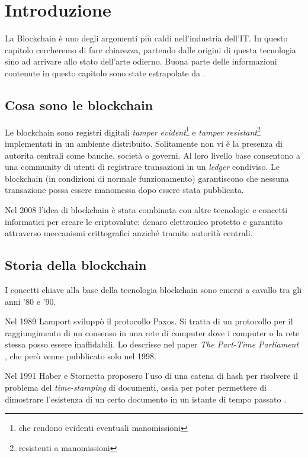 \chapter{Introduzione}

La Blockchain è uno degli argomenti più caldi nell'industria dell'IT. In questo
capitolo cercheremo di fare chiarezza, partendo dalle origini di questa tecnologia
sino ad arrivare allo stato dell'arte odierno.
Buona parte delle informazioni contenute in
questo capitolo sono state estrapolate da \cite{yaga2018blockchain}.

\section{Cosa sono le blockchain}
Le blockchain sono registri digitali
\textit{tamper evident}\footnote{che rendono evidenti eventuali manomissioni}
e \textit{tamper resistant}\footnote{resistenti a manomissioni}
implementati in un ambiente distribuito.
Solitamente non vi è la presenza di autorita centrali come banche, società o governi.
Al loro livello base consentono a una community di utenti di registrare
transazioni in un \textit{ledger} condiviso.
Le blockchain (in condizioni di normale funzionamento) garantiscono che
nessuna transazione possa essere manomessa dopo essere stata pubblicata.

Nel 2008 l'idea di blockchain
è stata combinata con altre tecnologie e concetti informatici
per creare le criptovalute:
denaro elettronico protetto e garantito attraverso meccanismi crittografici anziché
tramite autorità centrali.

\section{Storia della blockchain}
I concetti chiave alla base della tecnologia blockchain sono emersi a cavallo tra gli anni '80 e '90.

Nel 1989 Lamport sviluppò il protocollo Paxos. Si tratta di
un protocollo per il raggiungimento di un consenso in una rete di computer
dove i computer o la rete stessa posso essere inaffidabili. Lo descrisse nel paper
\textit{The Part-Time Parliament} \cite{lamport1998part},
che però venne pubblicato solo nel 1998.

Nel 1991 Haber e Stornetta proposero l'uso di una catena di hash
per risolvere il problema del \textit{time-stamping} di documenti,
ossia per poter permettere di dimostrare l'esistenza di un certo
documento in un istante di tempo passato \cite{haber1990time}.

